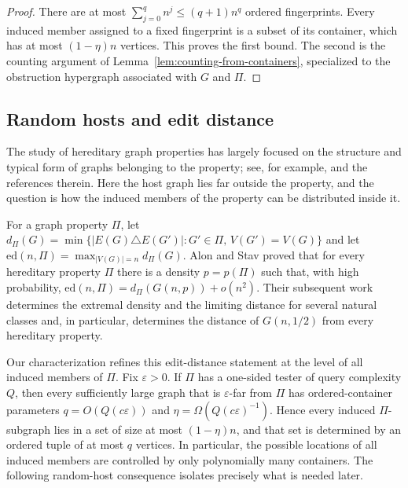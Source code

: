 \documentclass[11pt,reqno,letterpaper]{amsart}
\theoremstyle{plain}
\theoremstyle{remark}
\begin{document}
\begin{proof}
There are at most $\sum_{j=0}^{q}n^j\leq(q+1)n^q$ ordered fingerprints.  Every induced member assigned to a fixed fingerprint is a subset of its container, which has at most $(1-\eta)n$ vertices.  This proves the first bound.  The second is the counting argument of Lemma~\ref{lem:counting-from-containers}, specialized to the obstruction hypergraph associated with $G$ and $\Pi$.
\end{proof}

\subsection{Random hosts and edit distance}

The study of hereditary graph properties has largely focused on the structure
and typical form of graphs belonging to the property; see, for example,
\cite{alon2011structure}
and the references therein.  Here the host graph lies far outside the
property, and the question is how the induced members of the property can be
distributed inside it.

For a graph property $\Pi$, let
\(d_\Pi(G)=\min\{|E(G)\triangle E(G')|:G'\in\Pi, \,V(G')=V(G)\}\)
and let $\mathrm{ed}(n,\Pi)=\max_{|V(G)|=n}d_\Pi(G)$.  Alon and Stav
\cite{alon2008furthest} proved that for every hereditary property $\Pi$ there
is a density $p=p(\Pi)$ such that, with high probability,
\(\mathrm{ed}(n,\Pi)=d_\Pi(G(n,p))+o(n^2).\)
Their subsequent work \cite{alon2008maximum} determines the extremal density
and the limiting distance for several natural classes and, in particular,
determines the distance of $G(n,1/2)$ from every hereditary property.

Our characterization refines this edit-distance statement at the level of all
induced members of $\Pi$.  Fix $\varepsilon>0$.  If $\Pi$ has a one-sided
tester of query complexity $Q$, then every sufficiently large graph that is
$\varepsilon$-far from $\Pi$ has ordered-container parameters
$q=O(Q(c\varepsilon))$ and
$\eta=\Omega(Q(c\varepsilon)^{-1})$.  Hence every induced $\Pi$-subgraph lies
in a set of size at most $(1-\eta)n$, and that set is determined by an ordered
tuple of at most $q$ vertices.  In particular, the possible locations of all
induced members are controlled by only polynomially many containers.  The
following random-host consequence isolates precisely what is needed later.
\end{document}
